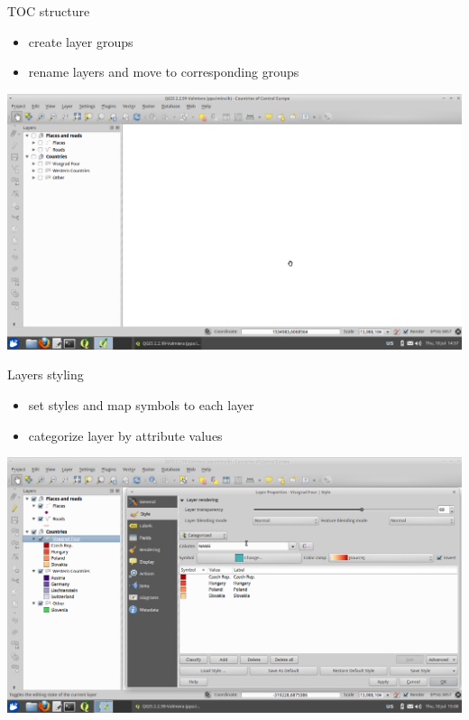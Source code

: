 \documentclass[12pt]{beamer}
\begin{document}
\begin{frame}{TOC structure}
	\begin{itemize}
		\item create layer groups
		\item rename layers and move to corresponding groups
	\end{itemize}
	\begin{center}
		\includegraphics[keepaspectratio=true,height=0.6\textheight]{images/rapid-gis-deployment/project-create-toc-structure.png}
	\end{center}
\end{frame}


\begin{frame}{Layers styling}
	\begin{itemize}
		\item set styles and map symbols to each layer
		\item categorize layer by attribute values
	\end{itemize}
	\begin{center}
		\includegraphics[keepaspectratio=true,height=0.6\textheight]{images/rapid-gis-deployment/project-layer-style.png}
	\end{center}
\end{frame}
\end{document}
